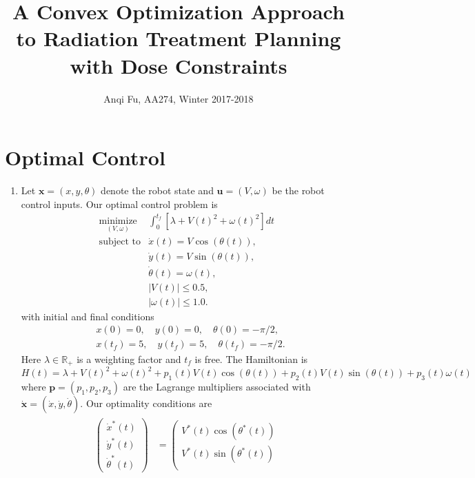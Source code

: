 \documentclass[12pt]{article}
\title{\Large{
		A Convex Optimization Approach to 
		Radiation Treatment Planning with Dose Constraints}}
\author{Anqi Fu, AA274, Winter 2017-2018}
\begin{document}
\maketitle

\section{Optimal Control}
\begin{enumerate}
	\item Let $\mathbf{x} = (x,y,\theta)$ denote the robot state and $\mathbf{u} = (V,\omega)$ be the robot control inputs. Our optimal control problem is
	\begin{equation}\label{eqn:1_1_opt}
		\begin{array}{cc}
		\underset{(V,\omega)}{\mbox{minimize}} & \int_0^{t_f} [\lambda + V(t)^2 + \omega(t)^2]dt \\
		\mbox{subject to} & \dot x(t) = V\cos(\theta(t)), \\
		& \dot y(t) = V\sin(\theta(t)), \\
		& \dot \theta(t) = \omega(t), \\
		& |V(t)| \leq 0.5, \\
		& |\omega(t)| \leq 1.0.
		\end{array}
	\end{equation}
	with initial and final conditions
	\begin{align*}
		&x(0) = 0, \quad y(0) = 0, \quad \theta(0) = -\pi/2, \\
		&x(t_f) = 5, \quad y(t_f) = 5, \quad \theta(t_f) = -\pi/2.
	\end{align*}
	Here $\lambda \in \mathbb{R}_+$ is a weighting factor and $t_f$ is free. The Hamiltonian is
	\[
		H(t) = \lambda + V(t)^2 + \omega(t)^2 + p_1(t)V(t)\cos(\theta(t)) + p_2(t)V(t)\sin(\theta(t)) + p_3(t)\omega(t)
	\]
	where $\mathbf{p} = (p_1,p_2,p_3)$ are the Lagrange multipliers associated with $\dot{\mathbf{x}} = (\dot x, \dot y, \dot \theta)$. Our optimality conditions are
	\begin{align}\label{eqn:1_1_cond}
	\begin{split}
		\left(\begin{array}{c}
		\dot x^*(t) \\
		\dot y^*(t) \\
		\dot \theta^*(t)
		\end{array}\right) &=
		\left(\begin{array}{c}
		V^*(t)\cos(\theta^*(t)) \\
		V^*(t)\sin(\theta^*(t)) \\

\end{array}
\end{split}
\end{align}
\end{enumerate}
\end{document}

